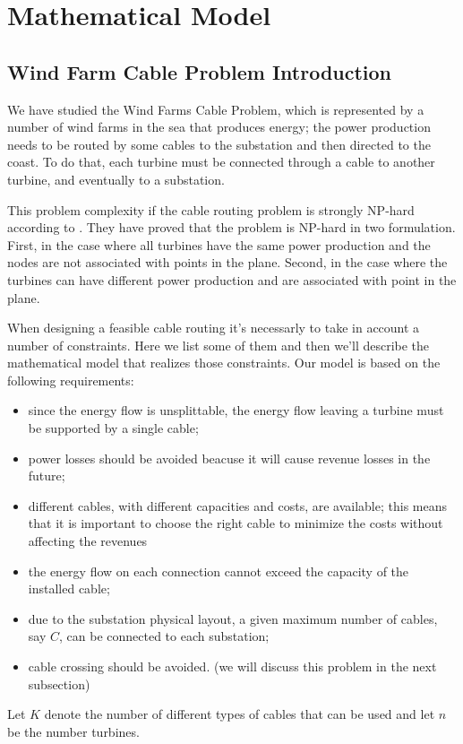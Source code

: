 
\chapter{Mathematical Model}
\label{chp:2-Model}

\section{Wind Farm Cable Problem Introduction}We have studied the Wind Farms Cable Problem, which is represented by a number of wind farms in the sea that produces energy; the power production needs to be routed by some cables to the substation and then directed to the coast.
To do that, each turbine must be connected through a cable to another turbine, and eventually to a substation.

This problem complexity if the cable routing problem is strongly NP-hard according to \cite{wfcp}. They have proved that the problem is NP-hard in two formulation. First, in the case where all turbines have the same power production and the nodes are not associated with points in the plane. Second, in the case where the turbines can have different power production and are associated with point in the plane. 

When designing a feasible cable routing it's necessarly to take in account a number of constraints. Here we list some of them and then we'll describe the mathematical model that realizes those constraints. Our model is based on the following requirements:

\begin{itemize}
\item since the energy flow is unsplittable, the energy flow leaving a turbine must be supported by a single cable; 
\item power losses should be avoided beacuse it will cause revenue losses in the future;
\item different cables, with different capacities and costs, are available; this means that it is important to choose the right cable to minimize the costs without affecting the revenues 
\item the energy flow on each connection cannot exceed the capacity of the installed cable;
\item due to the substation physical layout, a given maximum number of cables, say $C$, can be connected to each substation; 
\item cable crossing should be avoided. (we will discuss this problem in the next subsection)
\end{itemize}
Let $K$ denote the number of different types of cables that can be used and let $n$ be the number turbines. 

